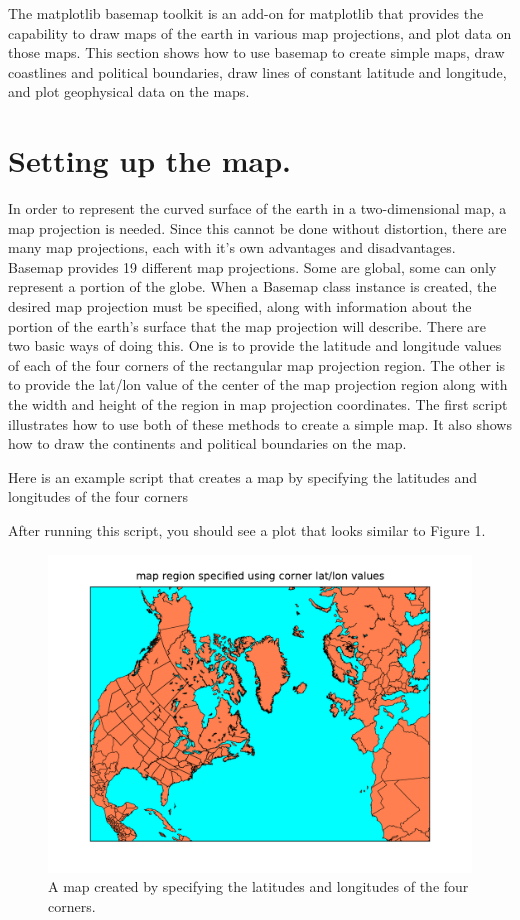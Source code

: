 The matplotlib basemap toolkit is an add-on for matplotlib that provides
the capability to draw maps of the earth in various map projections,
and plot data on those maps. This section shows how to use basemap
to create simple maps, draw coastlines and political boundaries, draw
lines of constant latitude and longitude, and plot geophysical data
on the maps.


\section{Setting up the map.}

In order to represent the curved surface of the earth in a two-dimensional
map, a map projection is needed. Since this cannot be done without
distortion, there are many map projections, each with it's own advantages
and disadvantages. Basemap provides 19 different map projections.
Some are global, some can only represent a portion of the globe. When
a Basemap class instance is created, the desired map projection must
be specified, along with information about the portion of the earth's
surface that the map projection will describe. There are two basic
ways of doing this. One is to provide the latitude and longitude values
of each of the four corners of the rectangular map projection region.
The other is to provide the lat/lon value of the center of the map
projection region along with the width and height of the region in
map projection coordinates. The first script illustrates how to use
both of these methods to create a simple map. It also shows how to
draw the continents and political boundaries on the map.

Here is an example script that creates a map by specifying the latitudes
and longitudes of the four corners



After running this script, you should see a plot that looks similar
to Figure 1.

\begin{figure}[h]
\includegraphics[scale=0.75]{fig/basemap1}

\caption{A map created by specifying the latitudes and longitudes of the four
corners.}

\end{figure}

